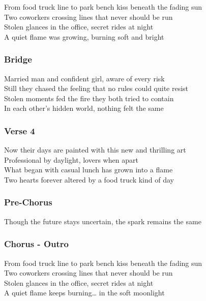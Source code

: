 From food truck line to park bench kiss beneath the fading sun\\
Two coworkers crossing lines that never should be run\\
Stolen glances in the office, secret rides at night\\
A quiet flame was growing, burning soft and bright

\subsubsection{Bridge}\label{bridge-29}

Married man and confident girl, aware of every risk\\
Still they chased the feeling that no rules could quite resist\\
Stolen moments fed the fire they both tried to contain\\
In each other's hidden world, nothing felt the same

\subsubsection{Verse 4}\label{verse-4-10}

Now their days are painted with this new and thrilling art\\
Professional by daylight, lovers when apart\\
What began with casual lunch has grown into a flame\\
Two hearts forever altered by a food truck kind of day

\subsubsection{Pre-Chorus}\label{pre-chorus-60}

Though the future stays uncertain, the spark remains the same

\subsubsection{Chorus - Outro}\label{chorus---outro-6}

From food truck line to park bench kiss beneath the fading sun\\
Two coworkers crossing lines that never should be run\\
Stolen glances in the office, secret rides at night\\
A quiet flame keeps burning\ldots{} in the soft moonlight

